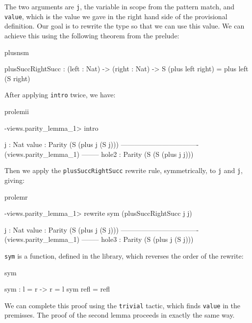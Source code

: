 \noindent
The two arguments are \texttt{j}, the variable in scope from the pattern match,
and \texttt{value}, which is the value we gave in the right hand side of the
provisional definition. Our goal is to rewrite the type so that we can use
this value.
We can achieve this using the following theorem from
the prelude:

\begin{SaveVerbatim}{plusnsm}

plusSuccRightSucc : (left : Nat) -> (right : Nat) ->
  S (plus left right) = plus left (S right)


\end{SaveVerbatim}

\noindent
After applying \texttt{intro} twice, we have:

\begin{SaveVerbatim}{prolemii}

-views.parity_lemma_1> intro 

  j : Nat
  value : Parity (S (plus j (S j)))
---------------------------------- (views.parity_lemma_1) --------
{hole2} : Parity (S (S (plus j j)))

\end{SaveVerbatim}

\noindent
Then we apply the \texttt{plusSuccRightSucc} rewrite rule, symmetrically,
to \texttt{j} and \texttt{j}, giving:

\begin{SaveVerbatim}{prolemr}

-views.parity_lemma_1> rewrite sym (plusSuccRightSucc j j) 
 
  j : Nat
  value : Parity (S (plus j (S j)))
---------------------------------- (views.parity_lemma_1) --------
{hole3} : Parity (S (plus j (S j)))

\end{SaveVerbatim}

\noindent
\texttt{sym} is a function, defined in the library, which reverses the order of the rewrite:

\begin{SaveVerbatim}{sym}

sym : l = r -> r = l
sym refl = refl

\end{SaveVerbatim}

\noindent
We can complete this proof using the \texttt{trivial} tactic, which finds 
\texttt{value} in the premisses. The proof of the second lemma proceeds in
exactly the same way.

